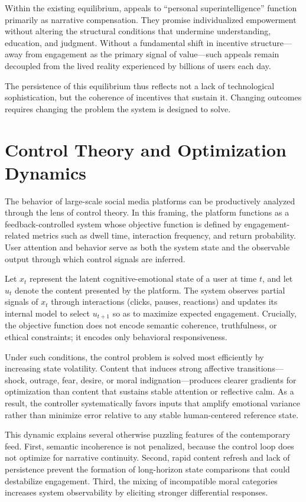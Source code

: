 \documentclass[12pt]{article}
\begin{document}
Within the existing equilibrium, appeals to ``personal superintelligence'' function primarily as narrative compensation. They promise individualized empowerment without altering the structural conditions that undermine understanding, education, and judgment. Without a fundamental shift in incentive structure—away from engagement as the primary signal of value—such appeals remain decoupled from the lived reality experienced by billions of users each day.

The persistence of this equilibrium thus reflects not a lack of technological sophistication, but the coherence of incentives that sustain it. Changing outcomes requires changing the problem the system is designed to solve.

\section{Control Theory and Optimization Dynamics}

The behavior of large-scale social media platforms can be productively analyzed through the lens of control theory. In this framing, the platform functions as a feedback-controlled system whose objective function is defined by engagement-related metrics such as dwell time, interaction frequency, and return probability. User attention and behavior serve as both the system state and the observable output through which control signals are inferred.

Let $x_t$ represent the latent cognitive-emotional state of a user at time $t$, and let $u_t$ denote the content presented by the platform. The system observes partial signals of $x_t$ through interactions (clicks, pauses, reactions) and updates its internal model to select $u_{t+1}$ so as to maximize expected engagement. Crucially, the objective function does not encode semantic coherence, truthfulness, or ethical constraints; it encodes only behavioral responsiveness.

Under such conditions, the control problem is solved most efficiently by increasing state volatility. Content that induces strong affective transitions—shock, outrage, fear, desire, or moral indignation—produces clearer gradients for optimization than content that sustains stable attention or reflective calm. As a result, the controller systematically favors inputs that amplify emotional variance rather than minimize error relative to any stable human-centered reference state.

This dynamic explains several otherwise puzzling features of the contemporary feed. First, semantic incoherence is not penalized, because the control loop does not optimize for narrative continuity. Second, rapid content refresh and lack of persistence prevent the formation of long-horizon state comparisons that could destabilize engagement. Third, the mixing of incompatible moral categories increases system observability by eliciting stronger differential responses.
\end{document}
